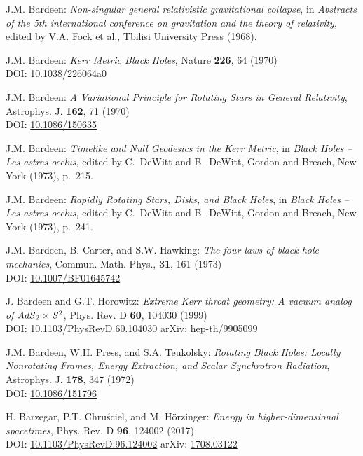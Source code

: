 \begin{thebibliography}{123}
J.M. Bardeen:
{\em Non-singular general relativistic gravitational collapse},
in \emph{Abstracts of the 5th international conference on gravitation and the theory of relativity}, edited by V.A. Fock et al., Tbilisi University Press (1968).

J.M. Bardeen:
{\em Kerr Metric Black Holes},
Nature {\bf 226}, 64 (1970)\\
DOI: \href{https://doi.org/10.1038/226064a0}{10.1038/226064a0}

J.M. Bardeen:
{\em A Variational Principle for Rotating Stars in General Relativity},
Astrophys. J. {\bf  162}, 71 (1970)\\
DOI: \href{https://doi.org/10.1086/150635}{10.1086/150635}

J.M. Bardeen:
{\em Timelike and Null Geodesics in the Kerr Metric},
in {\em Black Holes -- Les astres occlus},  edited by C.~DeWitt and B.~DeWitt,
Gordon and Breach, New York (1973), p.~215.

J.M. Bardeen:
{\em Rapidly Rotating Stars, Disks, and Black Holes},
in {\em Black Holes -- Les astres occlus},  edited by C.~DeWitt and B.~DeWitt,
Gordon and Breach, New York (1973), p.~241.

J.M. Bardeen, B. Carter, and S.W. Hawking:
{\em The four laws of black hole mechanics},
Commun. Math. Phys., {\bf 31}, 161 (1973)\\
DOI: \href{https://doi.org/10.1007/BF01645742}{10.1007/BF01645742}

J. Bardeen and G.T. Horowitz:
{\em Extreme Kerr throat geometry: A vacuum analog of ${\it AdS}_2\times{\it S}^2$},
Phys. Rev. D {\bf 60}, 104030 (1999)\\
DOI: \href{https://doi.org/10.1103/PhysRevD.60.104030}{10.1103/PhysRevD.60.104030}\hfill
arXiv: \href{https://arxiv.org/abs/hep-th/9905099}{hep-th/9905099}

J.M. Bardeen, W.H. Press, and S.A. Teukolsky:
{\em Rotating Black Holes: Locally Nonrotating Frames, Energy Extraction, and Scalar Synchrotron Radiation},
Astrophys. J. {\bf  178}, 347 (1972)\\
DOI: \href{https://doi.org/10.1086/151796}{10.1086/151796}

H. Barzegar, P.T. Chruściel, and M. Hörzinger:
{\em Energy in higher-dimensional spacetimes},
Phys. Rev. D {\bf 96}, 124002 (2017)\\
DOI: \href{https://doi.org/10.1103/PhysRevD.96.124002}{10.1103/PhysRevD.96.124002}\hfill
arXiv: \href{https://arxiv.org/abs/1708.03122}{1708.03122}


\end{thebibliography}

